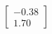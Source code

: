 \documentclass[preview]{standalone}
\begin{document}
\begin{align*}
\begin{bmatrix} -0.38 \\ 1.70 \end{bmatrix}
\end{align*}
\end{document}
